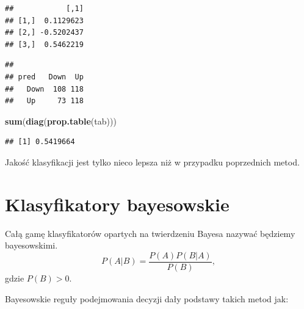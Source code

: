 \documentclass[]{book}
\newenvironment{Shaded}{\begin{snugshade}}{\end{snugshade}}
\newcommand{\DataTypeTok}[1]{\textcolor[rgb]{0.13,0.29,0.53}{#1}}
\newcommand{\KeywordTok}[1]{\textcolor[rgb]{0.13,0.29,0.53}{\textbf{#1}}}
\newcommand{\NormalTok}[1]{#1}
\newcommand{\OperatorTok}[1]{\textcolor[rgb]{0.81,0.36,0.00}{\textbf{#1}}}
\newcommand{\StringTok}[1]{\textcolor[rgb]{0.31,0.60,0.02}{#1}}
\theoremstyle{plain}
\theoremstyle{definition}
\theoremstyle{definition}
\theoremstyle{definition}
\theoremstyle{definition}
\theoremstyle{remark}
\begin{document}
\begin{Shaded}
\end{Shaded}

\begin{verbatim}
##            [,1]
## [1,]  0.1129623
## [2,] -0.5202437
## [3,]  0.5462219
\end{verbatim}

\begin{Shaded}
\end{Shaded}

\begin{verbatim}
##       
## pred   Down  Up
##   Down  108 118
##   Up     73 118
\end{verbatim}

\begin{Shaded}
\begin{Highlighting}[]
\KeywordTok{sum}\NormalTok{(}\KeywordTok{diag}\NormalTok{(}\KeywordTok{prop.table}\NormalTok{(tab)))}
\end{Highlighting}
\end{Shaded}

\begin{verbatim}
## [1] 0.5419664
\end{verbatim}

Jakość klasyfikacji jest tylko nieco lepsza niż w przypadku poprzednich metod.

\hypertarget{bayes}{%
\chapter{Klasyfikatory bayesowskie}\label{bayes}}

Całą gamę klasyfikatorów opartych na twierdzeniu Bayesa nazywać będziemy bayesowskimi.
\begin{equation}\label{bayes}
        P(A|B)=\frac{P(A)P(B|A)}{P(B)},
\end{equation}
gdzie \(P(B)>0\).

Bayesowskie reguły podejmowania decyzji dały podstawy takich metod jak:
\end{document}
